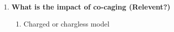 \documentclass[journal=accacs,manuscript=article, email=true, layout=traditional]{achemso}
\begin{document}
\begin{enumerate}
\item \textbf{What is the impact of co-caging (Relevent?)}

\begin{enumerate}
\item Charged or chargless model
\end{enumerate}
\end{enumerate}
\end{document}
